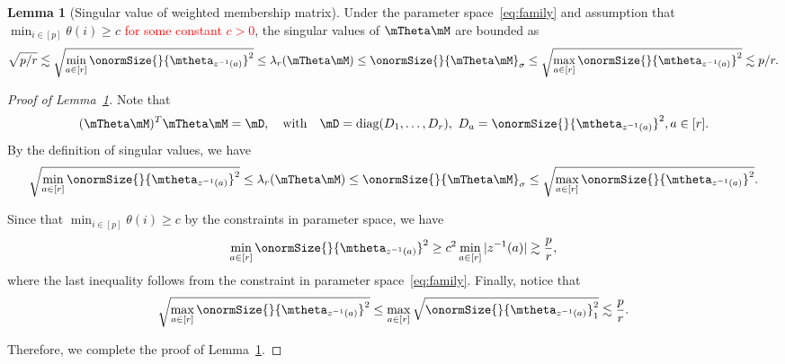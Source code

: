 \documentclass[lettersize,onecolumn,journal]{IEEEtran}
\theoremstyle{definition}
\newtheorem{lem}{Lemma}
\theoremstyle{definition}
\begin{document}


\begin{lem}[Singular value of weighted membership matrix]\label{lem:singular_thetam} Under the parameter space~\eqref{eq:family} and assumption that $\min_{i \in [p]} \theta(i) \geq c$ \textcolor{red}{for some constant $c >0$}, the singular values of $\mTheta \mM$ are bounded as 
\begin{equation}\label{eq:membership2}
     \sqrt{p/r} \lesssim \sqrt{ \min_{a \in [r]}\onormSize{}{ \mtheta_{ z^{-1}(a)} }^2 }  \leq \lambda_{r}(\mTheta \mM) \leq \onormSize{}{\mTheta \mM}_{\sigma} \leq\sqrt{ \max_{a \in [r]}\onormSize{}{ \mtheta_{ z^{-1}(a)} }^2 } \lesssim  p /r .
\end{equation}
\end{lem}

\begin{proof}[Proof of Lemma~\ref{lem:singular_thetam}] Note that 
\begin{equation}
    (\mTheta\mM)^T \mTheta \mM = \mD, \quad \text{with} \quad \mD = \text{diag}(D_1,\ldots, D_r), \ D_a = \onormSize{}{\mtheta_{z^{-1}(a)}}^2, a \in [r].
\end{equation}
By the definition of singular values, we have 
\begin{equation}
     \sqrt{\min_{a \in [r]}\onormSize{}{ \mtheta_{ z^{-1}(a)} }^2 } \leq \lambda_r(\mTheta \mM) \leq \onormSize{}{\mTheta\mM}_{\sigma} \leq \sqrt{ \max_{a \in [r]}\onormSize{}{ \mtheta_{ z^{-1}(a)} }^2}.
\end{equation}

Since that $\min_{i \in [p]}\theta(i) \geq c$ by the constraints in parameter space, we have  
\begin{equation}
   \min_{a \in [r]} \onormSize{}{ \mtheta_{ z^{-1}(a)} }^2 \geq c^2 \min_{a \in [r]} |z^{-1}(a)| \gtrsim \frac{p}{r},
\end{equation}
where the last inequality follows from the constraint in parameter space~\eqref{eq:family}. Finally, notice that 
\begin{equation}
    \sqrt{\max_{a \in [r]}\onormSize{}{ \mtheta_{ z^{-1}(a)} }^2 } \leq \max_{a \in [r]} \sqrt{ \onormSize{}{ \mtheta_{ z^{-1}(a)} }^2_1} \lesssim \frac{p}{r}.
\end{equation}

 Therefore, we complete the proof of Lemma~\ref{lem:singular_thetam}.
\end{proof}
\end{document}
